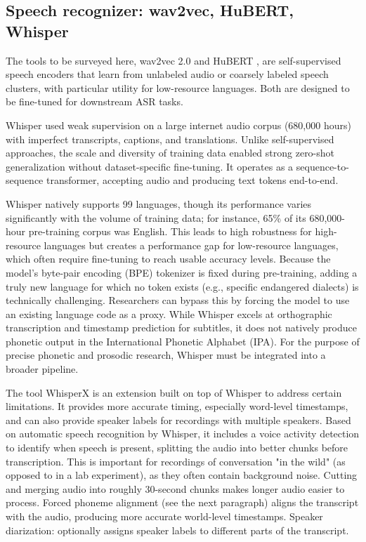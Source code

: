 \subsection{Speech recognizer: wav2vec, HuBERT, Whisper}

The tools to be surveyed here, wav2vec 2.0 \cite{baevski2020} and HuBERT \cite{hsu2021hubert}, are self-supervised speech encoders that learn from unlabeled audio or coarsely labeled speech clusters, with particular utility for low-resource languages. Both are designed to be fine-tuned for downstream ASR tasks.

Whisper \cite{radford2023whisper} used weak supervision on a large internet audio corpus (680,000 hours) with imperfect transcripts, captions, and translations. Unlike self-supervised approaches, the scale and diversity of training data enabled strong zero-shot generalization without dataset-specific fine-tuning. It operates as a sequence-to-sequence transformer, accepting audio and producing text tokens end-to-end.

Whisper natively supports 99 languages, though its performance varies significantly with the volume of training data; for instance, 65\% of its 680,000-hour pre-training corpus was English. This leads to high robustness for high-resource languages but creates a performance gap for low-resource languages, which often require fine-tuning to reach usable accuracy levels. Because the model's byte-pair encoding (BPE) tokenizer is fixed during pre-training, adding a truly new language for which no token exists (e.g., specific endangered dialects) is technically challenging. Researchers can bypass this by forcing the model to use an existing language code as a proxy. While Whisper excels at orthographic transcription and timestamp prediction for subtitles, it does not natively produce phonetic output in the International Phonetic Alphabet (IPA). For the purpose of precise phonetic and prosodic research, Whisper must be integrated into a broader pipeline.

The tool WhisperX \cite{bain2023whisperx} is an extension built on top of Whisper to address certain limitations. It provides more accurate timing, especially word-level timestamps, and can also provide speaker labels for recordings with multiple speakers. Based on automatic speech recognition by Whisper, it includes a voice activity detection to identify when speech is present, splitting the audio into better chunks before transcription. This is important for recordings of conversation "in the wild" (as opposed to in a lab experiment), as they often contain background noise. Cutting and merging audio into roughly 30-second chunks makes longer audio easier to process. Forced phoneme alignment (see the next paragraph) aligns the transcript with the audio, producing more accurate world-level timestamps. Speaker diarization: optionally assigns speaker labels to different parts of the transcript.

